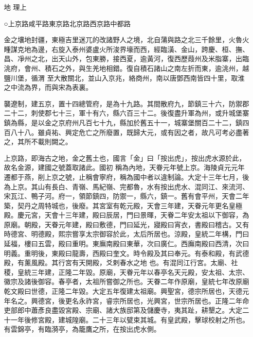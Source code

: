 
\begin{pinyinscope}

 地
 理上



 ○上京路咸平路東京路北京路西京路中都路



 金之壤地封疆，東極吉里迷兀的改諸野人之境，北自蒲與路之北三千餘里，火魯火畽謀克地為邊，右旋入泰州婆盧火所浚界壕而西，經臨潢、金山，跨慶、桓、撫、昌、凈州之北，出天山外，包東勝，接西夏，逾黃河，復西歷葭州及米脂寨，出臨洮府，會州、積石之外，與生羌地相錯。復自積石諸山之南左折而東，逾洮州，越鹽川堡，循渭
 至大散關北，並山入京兆，絡商州，南以唐鄧西南皆四十里，取淮之中流為界，而與宋為表裏。



 襲遼制，建五京，置十四總管府，是為十九路。其間散府九，節鎮三十六，防禦郡二十二，刺使郡七十三，軍十有六，縣六百三十二。後復盡升軍為州，或升城堡寨鎮為縣，是以金之京府州凡百七十九，縣加於舊五十一，城寨堡關百二十二，鎮四百八十八。雖貞祐、興定危亡之所廢置，既歸大元，或有因之者，故凡可考必盡著之，其所不載則闕之。



 上京路，即海古之地，金之舊土也，國言「金」曰「按出虎」，按出虎水源於此，故名金源，建國之號蓋取諸此。國初
 稱為內地，天眷元年號上京。海陵貞元元年遷都于燕，削上京之號，止稱會寧府，稱為國中者以違制論。大定十三年七月，後為上京。其山有長白、青嶺、馬紀嶺、完都魯，水有按出虎水、混同江、來流河、宋瓦江、鴨子河。府一，領節鎮四，防禦一，縣六，鎮一。舊有會平州，天會二年築，契丹之周特城也，後廢。其宮室有乾元殿，天會三年建，天眷元年更名皇極殿。慶元宮，天會十三年建，殿曰辰居，門曰景暉，天眷二年安太祖以下御容，為原廟。朝殿，天眷元年建，殿曰敷德，門曰延光，寢殿曰宵衣，書殿曰稽古。又有時德宮、明德殿，熙宗嘗享太宗御容於此，太后所居也。涼殿，皇統二年構，門曰延福，樓曰五雲，殿曰重明。東廡南殿曰東華，次曰廣仁。西廡南殿曰西清，次曰明義。重明後，東殿曰龍壽，西殿曰奎文。時令殿及其曰奉元。有泰和殿，有武德殿，有薰風殿。其行宮有天開殿，爻剌春水之地
 也。有混同江行宮。太廟、社稷，皇統三年建，正隆二年毀。原廟，天眷元年以春亭名天元殿，安太祖、太宗、徽宗及諸後御容。春亭者，太祖所嘗御之所也。天眷二年作原廟，皇統七年改原廟乾文殿曰世德，正隆二年毀。大定五年復建太祖廟。興聖宮，德宗所居也，天德元年名之。興德宮，後更名永祚宮，睿宗所居也，光興宮，世宗所居也。正隆二年命吏部郎中蕭彥良盡毀宮殿、宗廟、諸大族邸第及儲慶寺，夷其趾，耕墾之。大定二十一年後修宮殿，建城隍廟。二十三年以甓束其城。有皇武殿，擊球校射之所也。有雲錦亭，有臨漪亭，為籠鷹之所，在按出虎水側。




\end{pinyinscope}
